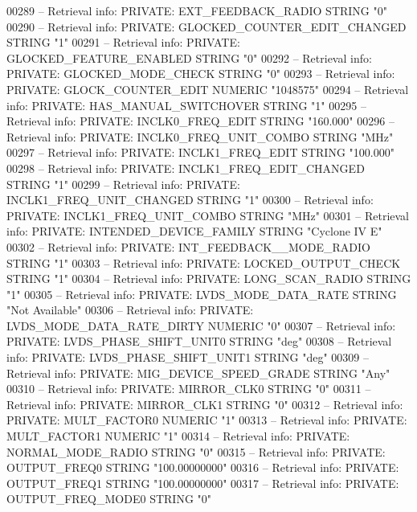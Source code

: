 \begin{DoxyCode}
{00289 \textcolor{keyword}{-- Retrieval info: PRIVATE: EXT\_FEEDBACK\_RADIO STRING "0"}
00290 \textcolor{keyword}{-- Retrieval info: PRIVATE: GLOCKED\_COUNTER\_EDIT\_CHANGED STRING "1"}
00291 \textcolor{keyword}{-- Retrieval info: PRIVATE: GLOCKED\_FEATURE\_ENABLED STRING "0"}
00292 \textcolor{keyword}{-- Retrieval info: PRIVATE: GLOCKED\_MODE\_CHECK STRING "0"}
00293 \textcolor{keyword}{-- Retrieval info: PRIVATE: GLOCK\_COUNTER\_EDIT NUMERIC "1048575"}
00294 \textcolor{keyword}{-- Retrieval info: PRIVATE: HAS\_MANUAL\_SWITCHOVER STRING "1"}
00295 \textcolor{keyword}{-- Retrieval info: PRIVATE: INCLK0\_FREQ\_EDIT STRING "160.000"}
00296 \textcolor{keyword}{-- Retrieval info: PRIVATE: INCLK0\_FREQ\_UNIT\_COMBO STRING "MHz"}
00297 \textcolor{keyword}{-- Retrieval info: PRIVATE: INCLK1\_FREQ\_EDIT STRING "100.000"}
00298 \textcolor{keyword}{-- Retrieval info: PRIVATE: INCLK1\_FREQ\_EDIT\_CHANGED STRING "1"}
00299 \textcolor{keyword}{-- Retrieval info: PRIVATE: INCLK1\_FREQ\_UNIT\_CHANGED STRING "1"}
00300 \textcolor{keyword}{-- Retrieval info: PRIVATE: INCLK1\_FREQ\_UNIT\_COMBO STRING "MHz"}
00301 \textcolor{keyword}{-- Retrieval info: PRIVATE: INTENDED\_DEVICE\_FAMILY STRING "Cyclone IV E"}
00302 \textcolor{keyword}{-- Retrieval info: PRIVATE: INT\_FEEDBACK\_\_MODE\_RADIO STRING "1"}
00303 \textcolor{keyword}{-- Retrieval info: PRIVATE: LOCKED\_OUTPUT\_CHECK STRING "1"}
00304 \textcolor{keyword}{-- Retrieval info: PRIVATE: LONG\_SCAN\_RADIO STRING "1"}
00305 \textcolor{keyword}{-- Retrieval info: PRIVATE: LVDS\_MODE\_DATA\_RATE STRING "Not Available"}
00306 \textcolor{keyword}{-- Retrieval info: PRIVATE: LVDS\_MODE\_DATA\_RATE\_DIRTY NUMERIC "0"}
00307 \textcolor{keyword}{-- Retrieval info: PRIVATE: LVDS\_PHASE\_SHIFT\_UNIT0 STRING "deg"}
00308 \textcolor{keyword}{-- Retrieval info: PRIVATE: LVDS\_PHASE\_SHIFT\_UNIT1 STRING "deg"}
00309 \textcolor{keyword}{-- Retrieval info: PRIVATE: MIG\_DEVICE\_SPEED\_GRADE STRING "Any"}
00310 \textcolor{keyword}{-- Retrieval info: PRIVATE: MIRROR\_CLK0 STRING "0"}
00311 \textcolor{keyword}{-- Retrieval info: PRIVATE: MIRROR\_CLK1 STRING "0"}
00312 \textcolor{keyword}{-- Retrieval info: PRIVATE: MULT\_FACTOR0 NUMERIC "1"}
00313 \textcolor{keyword}{-- Retrieval info: PRIVATE: MULT\_FACTOR1 NUMERIC "1"}
00314 \textcolor{keyword}{-- Retrieval info: PRIVATE: NORMAL\_MODE\_RADIO STRING "0"}
00315 \textcolor{keyword}{-- Retrieval info: PRIVATE: OUTPUT\_FREQ0 STRING "100.00000000"}
00316 \textcolor{keyword}{-- Retrieval info: PRIVATE: OUTPUT\_FREQ1 STRING "100.00000000"}
00317 \textcolor{keyword}{-- Retrieval info: PRIVATE: OUTPUT\_FREQ\_MODE0 STRING "0"}
}
\end{DoxyCode}
